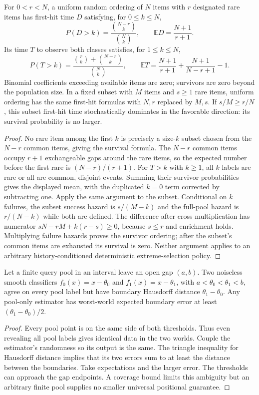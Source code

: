 \begin{proposition}
\label{prop:tail-r3}
For $0<r<N$, a uniform random ordering of $N$ items with $r$ designated
rare items has first-hit time $D$ satisfying, for $0\le k\le N$,
\[
 P(D>k)=\frac{\binom{N-r}{k}}{\binom Nk},\qquad
 \mathbb E D=\frac{N+1}{r+1}.
\]
Its time $T$ to observe both classes satisfies, for $1\le k\le N$,
\[
 P(T>k)=\frac{\binom rk+\binom{N-r}k}{\binom Nk},\qquad
 \mathbb E T=\frac{N+1}{r+1}+\frac{N+1}{N-r+1}-1.
\]
Binomial coefficients exceeding available items are zero; survivors
are zero beyond the population size.
In a fixed subset with $M$ items and $s\ge1$ rare items, uniform
ordering has the same first-hit formulas with $N,r$ replaced by $M,s$.
If $s/M\ge r/N$, this subset first-hit time stochastically dominates
in the favorable direction: its survival probability is no larger.
\end{proposition}
\begin{proof}
No rare item among the first $k$ is precisely a size-$k$ subset chosen
from the $N-r$ common items, giving the survival formula.
The $N-r$ common items occupy $r+1$ exchangeable gaps around the rare
items, so the expected number before the first rare is $(N-r)/(r+1)$.
For $T>k$ with $k\ge1$, all $k$ labels are rare or all are common,
disjoint events. Summing their survivor probabilities gives the
displayed mean, with the duplicated $k=0$ term corrected by subtracting
one. Apply the same argument to the subset.
Conditional on $k$ failures, the subset success hazard is $s/(M-k)$
and the full-pool hazard is $r/(N-k)$ while both are defined.
The difference after cross multiplication has numerator
$sN-rM+k(r-s)\ge0$, because $s\le r$ and enrichment holds.
Multiplying failure hazards proves the survivor ordering; after
the subset's common items are exhausted its survival is zero.
Neither argument applies to an arbitrary history-conditioned
deterministic extreme-selection policy.
\end{proof}

\begin{counterexample}
\label{ce:finite-boundary-r3}
Let a finite query pool in an interval leave an open gap $(a,b)$.
Two noiseless smooth classifiers $f_0(x)=x-\theta_0$ and
$f_1(x)=x-\theta_1$, with $a<\theta_0<\theta_1<b$, agree on every
pool label but have boundary Hausdorff distance $\theta_1-\theta_0$.
Any pool-only estimator has worst-world expected boundary error at
least $(\theta_1-\theta_0)/2$.
\end{counterexample}
\begin{proof}
Every pool point is on the same side of both thresholds. Thus even
revealing all pool labels gives identical data in the two worlds.
Couple the estimator's randomness so its output is the same.
The triangle inequality for Hausdorff distance implies that its two
errors sum to at least the distance between the boundaries. Take
expectations and the larger error. The thresholds can approach the
gap endpoints. A coverage bound limits this ambiguity but an arbitrary
finite pool supplies no smaller universal positional guarantee.
\end{proof}
